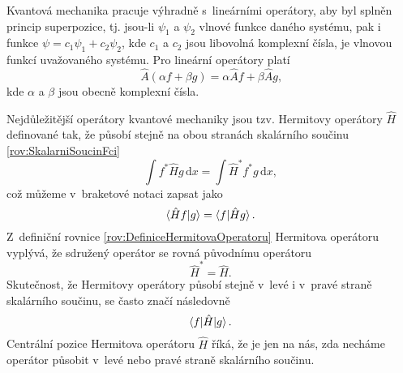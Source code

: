 Kvantová mechanika pracuje výhradně s~lineárními operátory, aby byl splněn princip superpozice, tj. jsou-li $\psi_1$ a $\psi_2$ vlnové funkce daného systému, pak i funkce $\psi=c_1\psi_1+c_2\psi_2$, kde $c_1$ a $c_2$ jsou libovolná komplexní čísla, je vlnovou funkcí uvažovaného systému. Pro lineární operátory platí
\begin{equation}
\boxed{\hat{A} (\alpha f + \beta g) = \alpha\hat{A}f + \beta\hat{A}g \mbox{,}}
\label{rov:LinearitaOperatoru}
\end{equation}
kde $\alpha$ a $\beta$ jsou obecně komplexní čísla.

Nejdůležitější operátory kvantové mechaniky jsou tzv. Hermitovy operátory $\hat{H}$ definované tak, že působí stejně na obou stranách skalárního součinu \eqref{rov:SkalarniSoucinFci}
\begin{equation}
\boxed{\int f^{\ast} \hat{H} g \,\mathrm{d}x = \int \hat{H}^{\ast} f^{\ast} g \,\mathrm{d}x,}
\label{rov:DefiniceHermitovaOperatoru}
\end{equation}
což můžeme v~braketové notaci zapsat jako
\begin{equation}
\braket{\hat{H}f|g} = \braket{f|\hat{H}g} \mbox{.}
\nonumber
\end{equation}
Z~definiční rovnice \eqref{rov:DefiniceHermitovaOperatoru} Hermitova operátoru vyplývá, že sdružený operátor se rovná původnímu operátoru
\begin{equation}
\hat{H}^{\ast} = \hat{H} \mbox{.}
\nonumber
\end{equation}
Skutečnost, že Hermitovy operátory působí stejně v~levé i v~pravé straně skalárního součinu, se často značí následovně
\begin{equation}
\braket{f|\hat{H}|g} \mbox{.}
\nonumber
\end{equation}
Centrální pozice Hermitova operátoru $\hat{H}$ říká, že je jen na nás, zda necháme operátor působit v~levé nebo pravé straně skalárního součinu.

